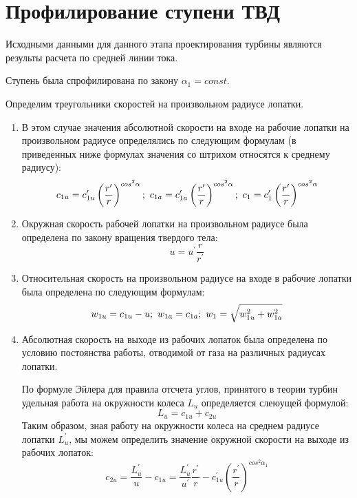 \section{Профилирование ступени ТВД}
Исходными данными для данного этапа проектирования турбины являются результы расчета по средней линии тока.

Ступень была спрофилирована по закону $\alpha_1=const$.

Определим треугольники скоростей на произвольном радиусе лопатки.

\begin{enumerate}

	\item В этом случае значения абсолютной скорости на входе на рабочие лопатки на произвольном радиусе определялись по следующим формулам (в приведенных ниже формулах значения со штрихом относятся к среднему радиусу):
		$$
			c_{1u} = c_{1u}^\prime \left( \frac{r^\prime}{r} \right)^{cos^2\alpha}; \/\
			c_{1a} = c_{1a}^\prime \left( \frac{r^\prime}{r} \right)^{cos^2\alpha}; \/\
			c_1 = c_1^\prime \left( \frac{r^\prime}{r} \right)^{cos^2\alpha}
		$$

	\item Окружная скорость рабочей лопатки на произвольном радиусе была определена по закону вращения твердого тела:
		$$
			u = u^\prime \frac{r}{r^\prime}
		$$

	\item Относительная скорость на произвольном радиусе на входе в рабочие лопатки была определена по следующим формулам:
		$$
			w_{1u} = c_{1u} - u; \/\ 
			w_{1a} = c_{1a}; \/\ 
			w_1 = \sqrt{w_{1u}^2 + w_{1a}^2}
		$$

	\item Абсолютная скорость на выходе из рабочих лопаток была определена по условию постоянства работы, отводимой от газа на различных радиусах лопатки.

	По формуле Эйлера для правила отсчета углов, принятого в теории турбин удельная работа на окружности колеса $L_u$ определяется слеюущей формулой:
		$$
			L_u = c_{1u} + c_{2u}
		$$
	Таким образом, зная работу на окружности колеса на среднем радиусе лопатки $L_u^\prime$, мы можем определить значение окружной скорости на выходе из рабочих лопаток:
		$$
			c_{2u} = \frac{L_u^\prime}{u} - c_{1u} =
				\frac{L_u^\prime}{u^\prime} 
				\frac{r^\prime}{r} - 
				c_{1u}^\prime \left( 
					\frac{r^\prime}{r} 
				\right)^{cos^2\alpha_1} 
		$$


\end{enumerate}
